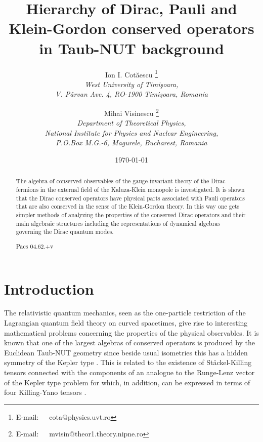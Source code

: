 \documentclass[a4paper,12pt]{article}
\begin{document}
\def\Eh{\mbox{\teneufm\char 83}}


\title{Hierarchy of Dirac, Pauli and Klein-Gordon conserved operators in  
Taub-NUT background}

\author{Ion I. Cot\u aescu \thanks{E-mail:~~~cota@physics.uvt.ro}\\ 
{\small \it West University of Timi\c soara,}\\
       {\small \it V. P\^ arvan Ave. 4, RO-1900 Timi\c soara, Romania}
\and
Mihai Visinescu \thanks{E-mail:~~~mvisin@theor1.theory.nipne.ro}\\
{\small \it Department of Theoretical Physics,}\\
{\small \it National Institute for Physics and Nuclear Engineering,}\\
{\small \it P.O.Box M.G.-6, Magurele, Bucharest, Romania}}
\date{\today}

\maketitle

\begin{abstract}
The algebra of conserved observables of the \coordHE{} gauge-in\-va\-riant 
theory of the Dirac fermions in the external field of the Kaluza-Klein 
monopole is investigated. It is shown that the Dirac conserved operators 
have physical parts associated with Pauli operators that are also conserved 
in the sense of the Klein-Gordon theory. In this way one gets simpler 
methods of analyzing the properties of the conserved Dirac operators and 
their main algebraic structures including the representations of dynamical 
algebras governing the Dirac quantum modes.


Pacs 04.62.+v

\end{abstract}

\newpage

\section{Introduction}

The relativistic quantum mechanics, seen as the one-particle restriction of 
the Lagrangian quantum field theory on curved spacetimes, give rise to 
interesting mathematical problems concerning the properties of the physical  
observables. It is known that one of the largest algebras of conserved 
operators is produced by the Euclidean Taub-NUT geometry since beside usual 
isometries this has a hidden symmetry of the Kepler type \cite{GM,GRFH}. 
This is related to the existence of St\" ackel-Killing tensors connected 
with the components of an analogue to the Runge-Lenz vector of the Kepler 
type problem for which, in addition, can be expressed in terms of four 
Killing-Yano tensors \cite{GRFH,vH1,VV}. 
\end{document}
